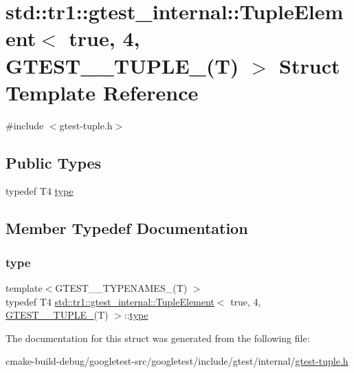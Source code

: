 \hypertarget{structstd_1_1tr1_1_1gtest__internal_1_1TupleElement_3_01true_00_014_00_01GTEST__10__TUPLE___07T_08_01_4}{}\section{std\+::tr1\+::gtest\+\_\+internal\+::Tuple\+Element$<$ true, 4, G\+T\+E\+S\+T\+\_\+\_\+\+T\+U\+P\+L\+E\+\_\+(T) $>$ Struct Template Reference}
\label{structstd_1_1tr1_1_1gtest__internal_1_1TupleElement_3_01true_00_014_00_01GTEST__10__TUPLE___07T_08_01_4}


{\ttfamily \#include $<$gtest-\/tuple.\+h$>$}

\subsection*{Public Types}
\begin{DoxyCompactItemize}
\item 
typedef T4 \mbox{\hyperlink{structstd_1_1tr1_1_1gtest__internal_1_1TupleElement_3_01true_00_014_00_01GTEST__10__TUPLE___07T_08_01_4_a8603bb94254b60248157a92e486b2d62}{type}}
\end{DoxyCompactItemize}


\subsection{Member Typedef Documentation}
\mbox{\label{structstd_1_1tr1_1_1gtest__internal_1_1TupleElement_3_01true_00_014_00_01GTEST__10__TUPLE___07T_08_01_4_a8603bb94254b60248157a92e486b2d62}} 
\subsubsection{\texorpdfstring{type}{type}}
{\footnotesize\ttfamily template$<$G\+T\+E\+S\+T\+\_\+\_\+\+T\+Y\+P\+E\+N\+A\+M\+E\+S\+\_\+(\+T) $>$ \\
typedef T4 \mbox{\hyperlink{structstd_1_1tr1_1_1gtest__internal_1_1TupleElement}{std\+::tr1\+::gtest\+\_\+internal\+::\+Tuple\+Element}}$<$ true, 4, \mbox{\hyperlink{namespacestd_1_1tr1_aa636d3269bf1f368a7bc09ff158bc482}{G\+T\+E\+S\+T\+\_\+\_\+\+T\+U\+P\+L\+E\+\_\+}}(T) $>$\+::\mbox{\hyperlink{structstd_1_1tr1_1_1gtest__internal_1_1TupleElement_3_01true_00_014_00_01GTEST__10__TUPLE___07T_08_01_4_a8603bb94254b60248157a92e486b2d62}{type}}}



The documentation for this struct was generated from the following file\+:\begin{DoxyCompactItemize}
\item 
cmake-\/build-\/debug/googletest-\/src/googletest/include/gtest/internal/\mbox{\hyperlink{gtest-tuple_8h}{gtest-\/tuple.\+h}}\end{DoxyCompactItemize}
